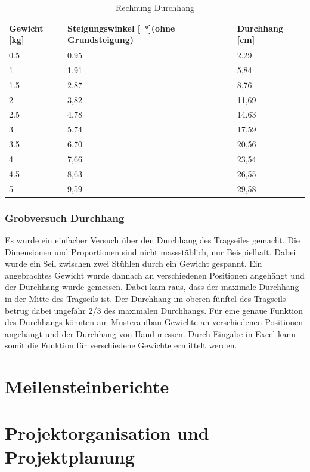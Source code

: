 \documentclass[a4paper]{report}
\begin{document}
\vspace{1em}
\noindent
\begin{table}[h!]
	\begin{tabular}{|p{}|p{}|p{}|}
		\hline
		\textbf{Gewicht [kg]} & \textbf{Steigungswinkel [\SI{}{\degree}](ohne Grundsteigung)} &\textbf{Durchhang [cm]}\\
		\hline
		0.5&0,95&2.29\\
		\hline
		1&1,91&5,84\\
		\hline
		1.5&2,87&8,76\\
		\hline
		2&3,82&11,69\\
		\hline
		2.5&4,78&14,63\\
		\hline
		3&5,74&17,59\\
		\hline
		3.5&6,70&20,56\\
		\hline
		4&7,66&23,54\\
		\hline
		4.5&8,63&26,55\\
		\hline
		5&9,59&29,58\\
		\hline
	\end{tabular}
	\caption{Rechnung Durchhang}
	\label{tbl:DurchhangRechnung}
\end{table}


\subsection{Grobversuch Durchhang}
\label{app:ssec:GrobeversDurch}
Es wurde ein einfacher Versuch über den Durchhang des Tragseiles gemacht. Die Dimensionen und Proportionen sind nicht massstäblich, nur Beispielhaft. Dabei wurde ein Seil zwischen zwei Stühlen durch ein Gewicht gespannt. Ein angebrachtes Gewicht wurde dannach an verschiedenen Positionen angehängt und der Durchhang wurde gemessen. Dabei kam raus, dass der maximale Durchhang in der Mitte des Tragseils ist. Der Durchhang im oberen fünftel des Tragseils betrug dabei ungefähr 2/3 des maximalen Durchhangs.
Für eine genaue Funktion des Durchhangs könnten am Musteraufbau Gewichte an verschiedenen Positionen angehängt und der Durchhang von Hand messen. Durch Eingabe in Excel kann somit die Funktion für verschiedene Gewichte ermittelt werden.

\chapter{Meilensteinberichte}
\label{app:ch:MeilensteinBerichte}

\chapter{Projektorganisation und Projektplanung}
\label{ch:ProjektOrga}
\end{document}
